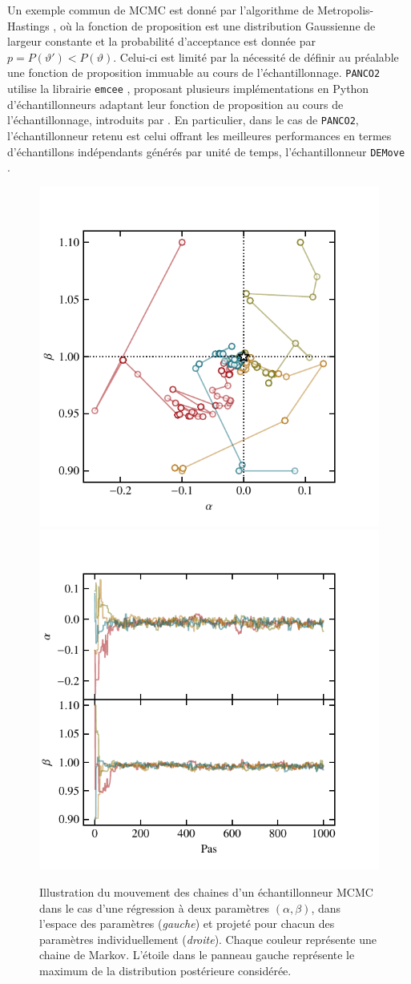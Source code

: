 Un exemple commun de MCMC est donné par l'algorithme de Metropolis-Hastings \cite{metropolis_monte_1949,hastings_monte_1970}, où la fonction de proposition est une distribution Gaussienne de largeur constante et la probabilité d'acceptance est donnée par $p = P(\vartheta') < P(\vartheta)$.
Celui-ci est limité par la nécessité de définir au préalable une fonction de proposition immuable au cours de l'échantillonnage.
\texttt{PANCO2} utilise la librairie \texttt{emcee} \cite{foreman-mackey_emcee_2019}, proposant plusieurs implémentations en Python d'échantillonneurs adaptant leur fonction de proposition au cours de l'échantillonnage, introduits par .
En particulier, dans le cas de \texttt{PANCO2}, l'échantillonneur retenu est celui offrant les meilleures performances en termes d'échantillons indépendants générés par unité de temps, l'échantillonneur \texttt{DEMove} \cite{nelson_run_2013}.

\begin{figure}[t]
    \centering
    \includegraphics[width=.495\textwidth]{Figures/Chap_panco/mcmc_params.pdf}
    \includegraphics[width=.495\textwidth]{Figures/Chap_panco/mcmc_trace.pdf}
    \caption{
        Illustration du mouvement des chaines d'un échantillonneur MCMC dans le cas d'une régression à deux paramètres $(\alpha, \beta)$, dans l'espace des paramètres (\textit{gauche}) et projeté pour chacun des paramètres individuellement (\textit{droite}).
        Chaque couleur représente une chaine de Markov.
        L'étoile dans le panneau gauche représente le maximum de la distribution postérieure considérée.
    }
    \label{fig:panco:mcmc}
\end{figure}

